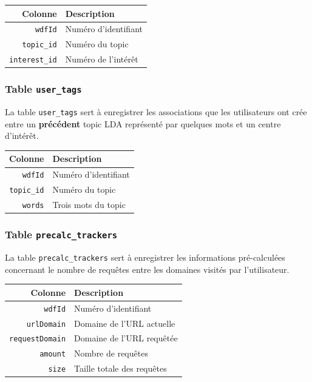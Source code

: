 			\begin{tabular}{rl}
				\textbf{Colonne} & \textbf{Description} \\
				\hline
				\texttt{wdfId} & Numéro d'identifiant \\
			    \texttt{topic\_id} & Numéro du topic \\
				\texttt{interest\_id} & Numéro de l'intérêt \\
			\end{tabular}
		
		\subsubsection{Table \texttt{user\_tags}}\label{table-user-tags}
			La table \texttt{user\_tags} sert à enregistrer les associations que les utilisateurs ont crée entre un \textbf{précédent} topic LDA représenté par quelques mots et un centre d'intérêt.

			\begin{tabular}{rl}
				\textbf{Colonne} & \textbf{Description} \\
				\hline
				\texttt{wdfId} & Numéro d'identifiant \\
			    \texttt{topic\_id} & Numéro du topic \\
				\texttt{words} & Trois mots du topic \\
			\end{tabular}
		
		\subsubsection{Table \texttt{precalc\_trackers}}\label{table-precalc-trackers}
			La table \texttt{precalc\_trackers} sert à enregistrer les informations pré-calculées concernant le nombre de requêtes entre les domaines visités par l'utilisateur.

			\begin{tabular}{rl}
				\textbf{Colonne} & \textbf{Description} \\
				\hline
				\texttt{wdfId} & Numéro d'identifiant \\
			    \texttt{urlDomain} & Domaine de l'URL actuelle \\
				\texttt{requestDomain} & Domaine de l'URL requêtée \\
				\texttt{amount} & Nombre de requêtes \\
				\texttt{size} & Taille totale des requêtes \\
			\end{tabular}
		
